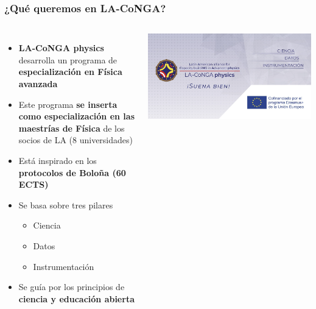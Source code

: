 \begin{frame}[fragile]
\frametitle{¿Qué queremos en LA-CoNGA?}
\begin{columns}[c] %


\begin{itemize}
	\item {\bf \color{LCredInst} LA-CoNGA physics} desarrolla un programa de {\bf  \color{LCblueInst} especialización en Física avanzada} 
	\item Este programa {\bf  \color{logoyellow} se inserta como especialización en las maestrías de Física} de los socios de LA (8 universidades)
	\item Está inspirado en los {\bf  \color{logobrownD} protocolos de Boloña (60 ECTS)}
	\item Se basa sobre tres pilares
	\begin{itemize}
		\item Ciencia
		\item Datos
		\item Instrumentación
		\end{itemize}
	\item Se guía por los principios de {\bf  \color{LCblueSec1} ciencia y educación abierta}
\end{itemize}


\begin{center}
\includegraphics[scale=0.07]{imagenes/principios.png}
\end{center}

\end{columns}


\end{frame}

